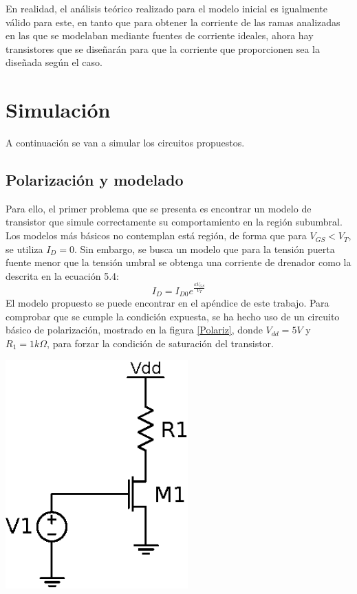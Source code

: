 	En realidad, el análisis teórico realizado para el modelo inicial es igualmente válido para este, en tanto que para obtener la corriente de las ramas analizadas en las que se modelaban mediante fuentes de corriente ideales, ahora hay transistores que se diseñarán para que la corriente que proporcionen sea la diseñada según el caso.
	
\section{Simulación}

A continuación se van a simular los circuitos propuestos. 

\subsection{Polarización y modelado}
Para ello, el primer problema que se presenta es encontrar un modelo de transistor que simule correctamente su comportamiento en la región subumbral. Los modelos más básicos no contemplan está región, de forma que para $V_{GS}<V_T$, se utiliza $I_D=0$. Sin embargo, se busca un modelo que para la tensión puerta fuente menor que la tensión umbral se obtenga una corriente de drenador como la descrita en la ecuación 5.4: $$I_D=I_{D0}e^{\frac{\kappa V_{GS}}{V_T}}$$ El modelo propuesto se puede encontrar en el apéndice de este trabajo. Para comprobar que se cumple la condición expuesta, se ha hecho uso de un circuito básico de polarización, mostrado en la figura \ref{Polariz}, donde $V_{dd}=5 V$ y $R_1=1k \Omega$, para forzar la condición de saturación del transistor.

	\begin{center}
		\includegraphics[width=7cm]{Imagenes/Sinaptico/Polariz.eps}
    		\label{Polariz}
	\end{center}	

